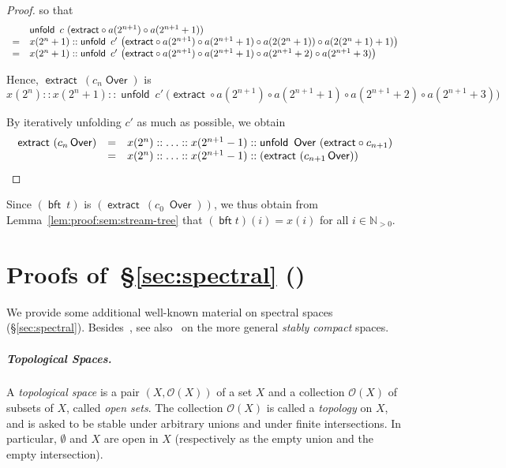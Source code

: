 \documentclass[%
  a4paper,
  UKenglish,
  cleveref,
  autoref,
  thm-restate,
  numberwithinsect,
]{lipics-v2021}
\newcommand\NN{\mathbb{N}}
\newcommand\comp{\mathbin\circ}
\newcommand\Open{\mathcal{O}}		%
\newcommand\term[1]{\mathsf{#1}}
\newcommand\unfold{\mathop{\term{unfold}}}
\newcommand\Colon{\mathrel{::}}
\newcommand\extract{\mathop{\term{extract}}}
\newcommand\Over{\mathop{\term{Over}}}
\newcommand\bft{\mathop{\term{bft}}}
\begin{document}
\begin{proof}
\noindent
so that
\[
\begin{array}{l l}
& \unfold\ c\ ({\extract} \comp {a(2^{n+1})} \comp a(2^{n+1}+1))
\\
%
  =
& x(2^n+1) \Colon
  \unfold\ c'\
  \big(
  {\extract} \comp {a(2^{n+1})} \comp a(2^{n+1}+1)
   \comp {a(2(2^n+1))} \comp a(2(2^n+1)+1)
  \big)
\\
%
  =
& x(2^n+1) \Colon
  \unfold\ c'\
  \big(
  {\extract} \comp {a(2^{n+1})} \comp a(2^{n+1}+1)
   \comp {a(2^{n+1}+2)} \comp a(2^{n+1}+3)
  \big)
\end{array}
\]

\noindent
Hence,
$\extract\ (c_n \Over)$ is
\[
  x(2^n) \Colon
  x(2^n+1) \Colon
  \unfold\ c'\
  \big(
  {\extract} \comp {a(2^{n+1})} \comp a(2^{n+1}+1)
   \comp {a(2^{n+1}+2)} \comp a(2^{n+1}+3)
  \big)
\]

\noindent
By iteratively unfolding $c'$ as much as possible,
we obtain
\[
\begin{array}{r c l}
  \extract\ (c_n \Over)
& =
& x(2^n) \Colon \ldots \Colon x(2^{n+1}-1) \Colon
  \unfold\ \Over\ ({\extract} \comp {c_{n+1}})
\\
%
& =
& x(2^n) \Colon \ldots \Colon x(2^{n+1}-1) \Colon
  (\extract\ (c_{n+1} \Over))
\end{array}
\]
\end{proof}


Since $(\bft\ t)$ is $(\extract\ (c_0\ \Over))$,
we thus obtain from Lemma~\ref{lem:proof:sem:stream-tree}
that $(\bft t)(i) = x(i)$ for all $i \in \NN_{>0}$.



\section{Proofs of~\S\ref{sec:spectral} ()}
\label{sec:proof:spectral}

We provide some additional
well-known material on spectral spaces (\S\ref{sec:spectral}).
Besides~\cite{dst19book,gg24book,goubault13book},
see also~\cite{lawson11mscs} on the more general \emph{stably compact} spaces.


\subparagraph*{Topological Spaces.}
A \emph{topological space} is a pair $(X,\Open(X))$ of a set $X$
and a collection $\Open(X)$ of subsets of $X$, called \emph{open sets}.
The collection $\Open(X)$
is called a \emph{topology} on $X$,
and is asked to be stable under arbitrary unions and under finite intersections.
In particular, $\emptyset$ and $X$ are open in $X$
(respectively as the empty union and the empty intersection).
\end{document}

